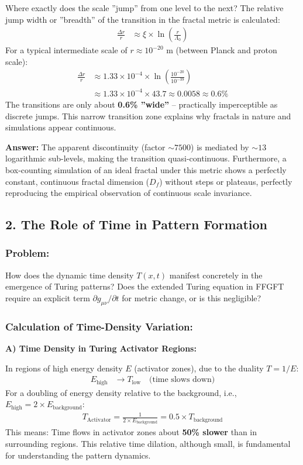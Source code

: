 	Where exactly does the scale ''jump'' from one level to the next? The relative jump width or ''breadth'' of the transition in the fractal metric is calculated:
	\begin{align*}
		\frac{\Delta r}{r} &\approx \xi \times \ln\left(\frac{r}{\Lambda_0}\right)
	\end{align*}
	For a typical intermediate scale of $r \approx 10^{-20}$ m (between Planck and proton scale):
	\begin{align*}
		\frac{\Delta r}{r} &\approx 1.33 \times 10^{-4} \times \ln\left(\frac{10^{-20}}{10^{-39}}\right) \\
		&\approx 1.33 \times 10^{-4} \times 43.7 \approx 0.0058 \approx 0.6\%
	\end{align*}
	The transitions are only about \textbf{0.6\% ''wide''} – practically imperceptible as discrete jumps. This narrow transition zone explains why fractals in nature and simulations appear continuous.
	
	\textbf{Answer:} The apparent discontinuity (factor $\sim 7500$) is mediated by $\sim 13$ logarithmic sub-levels, making the transition quasi-continuous. Furthermore, a box-counting simulation of an ideal fractal under this metric shows a perfectly constant, continuous fractal dimension ($D_f$) without steps or plateaus, perfectly reproducing the empirical observation of continuous scale invariance.
	
	\subsection*{2. The Role of Time in Pattern Formation}
	
	\subsubsection*{Problem:}
	How does the dynamic time density $T(x,t)$ manifest concretely in the emergence of Turing patterns? Does the extended Turing equation in FFGFT require an explicit term $\partial g_{\mu\nu}/\partial t$ for metric change, or is this negligible?
	
	\subsubsection*{Calculation of Time-Density Variation:}
	
	\textbf{A) Time Density in Turing Activator Regions:}
	
	In regions of high energy density $E$ (activator zones), due to the duality $T = 1/E$:
	\begin{align*}
		E_{\text{high}} &\rightarrow T_{\text{low}} \quad \text{(time slows down)}
	\end{align*}
	For a doubling of energy density relative to the background, i.e., $E_{\text{high}} = 2 \times E_{\text{background}}$:
	\begin{align*}
		T_{\text{Activator}} = \frac{1}{2 \times E_{\text{background}}} = 0.5 \times T_{\text{background}}
	\end{align*}
	This means: Time flows in activator zones about \textbf{50\% slower} than in surrounding regions. This relative time dilation, although small, is fundamental for understanding the pattern dynamics.
	
